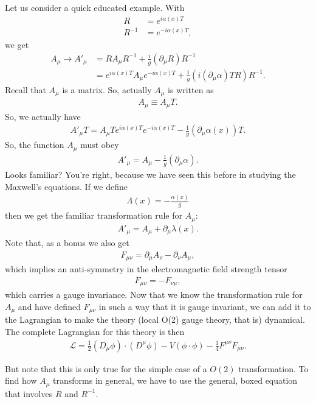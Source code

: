 \documentclass{book}
\numberwithin{equation}{section}
\theoremstyle{definition}
\newcommand{\p}{\partial}
\newcommand{\lag}{\mathcal{L}}
\begin{document}
Let us consider a quick educated example. With
\begin{align}
R &= e^{i\alpha(x)T}\\
R^{-1} &= e^{-i\alpha(x)T},
\end{align}
we get
\begin{align}
A_\mu \to A'_\mu &= RA_\mu R^{-1} + \frac{i}{g}(\p_\mu R)R^{-1}\\
&= e^{i\alpha(x)T}A_\mu e^{-i\alpha(x)T} + \frac{i}{g}\left(i(\p_\mu\alpha)TR\right)R^{-1}.
\end{align}
Recall that $A_\mu$ is a matrix. So, actually $A_\mu$ is written as
\begin{align}
A_\mu \equiv A_\mu T.
\end{align}
So, we actually have
\begin{align}
A'_\mu T = A_\mu T e^{i\alpha(x)T}e^{-i\alpha(x)T} - \frac{1}{g}(\p_\mu\alpha(x))T.
\end{align}
So, the function $A_\mu$ must obey
\begin{align}
A'_\mu = A_\mu - \frac{1}{g}(\p_\mu\alpha).
\end{align}
Looks familiar? You're right, because we have seen this before in studying the Maxwell's equations. If we define
\begin{align}
\Lambda(x) = - \frac{\alpha(x)}{g}
\end{align}
then we get the familiar transformation rule for $A_\mu$:
\begin{align}
A'_\mu = A_\mu + \p_\mu \lambda(x).
\end{align}
Note that, as a bonus we also get
\begin{align}
F_{\mu\nu} = \p_\mu A_\nu - \p_\nu A_\mu,
\end{align}
which implies an anti-symmetry in the electromagnetic field strength tensor
\begin{align}
F_{\mu\nu} = -F_{\nu\mu},
\end{align}
which carries a gauge invariance. Now that we know the transformation rule for $A_\mu$ and have defined $F_{\mu\nu}$ in such a way that it is gauge invariant, we can add it to the Lagrangian to make the theory (local O(2) gauge theory, that is) dynamical. The complete Lagrangian for this theory is then
\begin{align}
\lag = \frac{1}{2}(D_\mu\phi)\cdot(D^\mu\phi) - V(\phi\cdot\phi) - \frac{1}{4}F^{\mu\nu}F_{\mu\nu}.
\end{align}


But note that this is only true for the simple case of a $O(2)$ transformation. To find how $A_\mu$ transforms in general, we have to use the general, boxed equation that involves $R$ and $R^{-1}$. 
\end{document}
